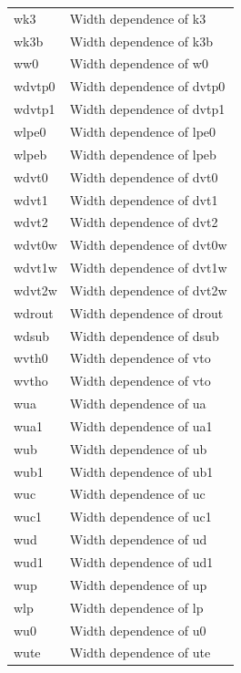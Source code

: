 \begin{longtable}{l l}
{\small wk3} & {\small Width dependence of k3} \\
{\small wk3b} & {\small Width dependence of k3b} \\
{\small ww0} & {\small Width dependence of w0} \\
{\small wdvtp0} & {\small Width dependence of dvtp0} \\
{\small wdvtp1} & {\small Width dependence of dvtp1} \\
{\small wlpe0} & {\small Width dependence of lpe0} \\
{\small wlpeb} & {\small Width dependence of lpeb} \\
{\small wdvt0} & {\small Width dependence of dvt0} \\
{\small wdvt1} & {\small Width dependence of dvt1} \\
{\small wdvt2} & {\small Width dependence of dvt2} \\
{\small wdvt0w} & {\small Width dependence of dvt0w} \\
{\small wdvt1w} & {\small Width dependence of dvt1w} \\
{\small wdvt2w} & {\small Width dependence of dvt2w} \\
{\small wdrout} & {\small Width dependence of drout} \\
{\small wdsub} & {\small Width dependence of dsub} \\
{\small wvth0} & {\small Width dependence of vto} \\
{\small wvtho} & {\small Width dependence of vto} \\
{\small wua} & {\small Width dependence of ua} \\
{\small wua1} & {\small Width dependence of ua1} \\
{\small wub} & {\small Width dependence of ub} \\
{\small wub1} & {\small Width dependence of ub1} \\
{\small wuc} & {\small Width dependence of uc} \\
{\small wuc1} & {\small Width dependence of uc1} \\
{\small wud} & {\small Width dependence of ud} \\
{\small wud1} & {\small Width dependence of ud1} \\
{\small wup} & {\small Width dependence of up} \\
{\small wlp} & {\small Width dependence of lp} \\
{\small wu0} & {\small Width dependence of u0} \\
{\small wute} & {\small Width dependence of ute} \\

\end{longtable}
